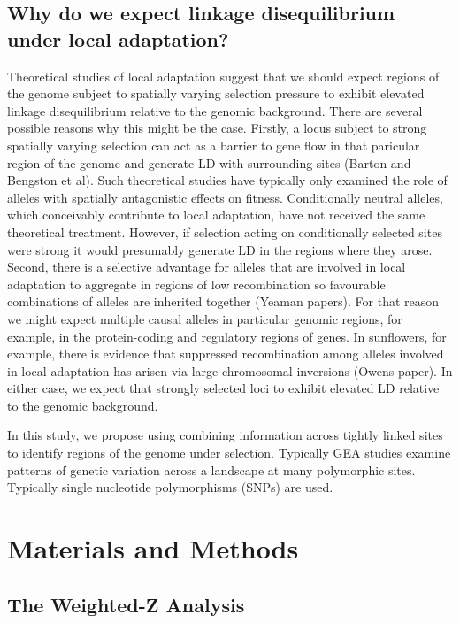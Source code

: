 \documentclass[11pt,twoside,lineno]{GSA_format}
\begin{document}
\subsection{Why do we expect linkage disequilibrium under local adaptation?}

Theoretical studies of local adaptation suggest that we should expect regions of the genome subject to spatially varying selection pressure to exhibit elevated linkage disequilibrium relative to the genomic background. There are several possible reasons why this might be the case. Firstly, a locus subject to strong spatially varying selection can act as a barrier to gene flow in that paricular region of the genome and generate LD with surrounding sites (Barton and Bengston et al). Such theoretical studies have typically only examined the role of alleles with spatially antagonistic effects on fitness. Conditionally neutral alleles, which conceivably contribute to local adaptation, have not received the same theoretical treatment. However, if selection acting on conditionally selected sites were strong it would presumably generate LD in the regions where they arose. Second, there is a selective advantage for alleles that are involved in local adaptation to aggregate in regions of low recombination so favourable combinations of alleles are inherited together (Yeaman papers). For that reason we might expect multiple causal alleles in particular genomic regions, for example, in the protein-coding and regulatory regions of genes. In sunflowers, for example, there is evidence that suppressed recombination among alleles involved in local adaptation has arisen via large chromosomal inversions (Owens paper). In either case, we expect that strongly selected loci to exhibit elevated LD relative to the genomic background.

In this study, we propose using combining information across tightly linked sites to identify regions of the genome under selection. Typically GEA studies examine patterns of genetic variation across a landscape at many polymorphic sites. Typically single nucleotide polymorphisms (SNPs) are used.
 
\section{Materials and Methods}
\label{sec:materials:methods}

\subsection{The Weighted-Z Analysis} 
\end{document}
